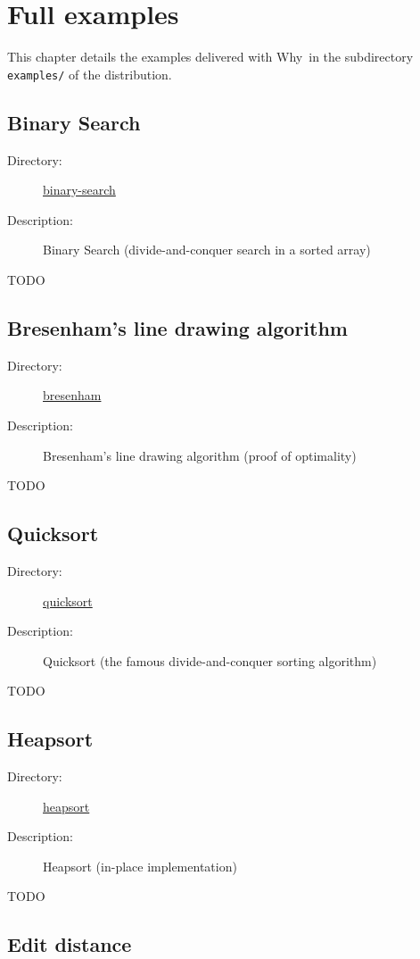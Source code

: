 \documentclass[a4paper,12pt]{report}
\newcommand{\why}{\textsf{Why}}
\begin{document}
\chapter{Full examples}
\label{examples}

This chapter details the examples delivered with \why\ in the
subdirectory \texttt{examples/} of the distribution.

\newcommand{\exsummary}[2]{%
  \begin{description}
  \item[Directory:] \url{#1}
  \item[Description:] #2
  \end{description}
}

\section{Binary Search}
\label{binarysearch}

\exsummary{binary-search}{Binary Search (divide-and-conquer search in
  a sorted array)}

TODO

\section{Bresenham's line drawing algorithm}
\label{bresenham}

\exsummary{bresenham}{Bresenham's line drawing algorithm (proof of optimality)}

TODO

\section{Quicksort}
\label{quicksort}

\exsummary{quicksort}{Quicksort (the famous divide-and-conquer sorting
  algorithm)}

TODO

\section{Heapsort}
\label{heapsort}

\exsummary{heapsort}{Heapsort (in-place implementation)}

TODO

\section{Edit distance}
\label{editdistance}
\end{document}
